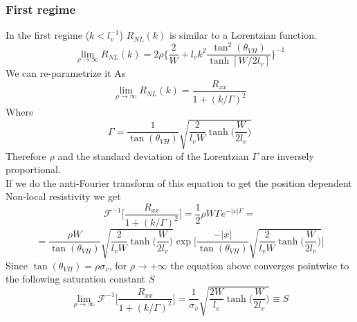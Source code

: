\subsubsection*{First regime}
In the first regime ($k< l_v^{-1}$) $R_{NL}(k)$ is similar to a Lorentzian function.
\begin{equation}
    \lim_{\rho\to\infty} R_{NL}(k)=2\rho
    \bigg\{
        \frac 2W+ l_vk^2\frac{\tan^2(\theta_{VH})}{\tanh[W/2l_v]}  
    \bigg\}^{-1}
\end{equation}
We can re-parametrize it As
\begin{equation}
    \lim_{\rho\to\infty} R_{NL}(k)=\frac{R_{xx}}{1+(k/\Gamma)^2}
\end{equation}
Where 
\[
    \Gamma=\frac 1 {\tan(\theta_{VH})}\sqrt{\frac 2{l_vW} \tanh\bigg(\frac W{2l_v}\bigg)}
\]
Therefore $\rho$ and the standard deviation of the Lorentzian $\Gamma$ are inversely proportional.\\
If we do the anti-Fourier transform of this equation to get the position dependent Non-local resistivity we get 
\[
    \mathcal F^{-1}\bigg[\frac{R_{xx}}{1+(k/\Gamma)^2} \bigg]=\frac 12\rho W\Gamma {e^{-|x|\Gamma}}=
\]
\begin{equation}
    =\frac {\rho W}{\tan(\theta_{VH})}\sqrt{\frac 2{l_v W}\tanh\bigg(\frac W{2l_v}\bigg)}
    \exp\Bigg[
        \frac{-|x|}{\tan(\theta_{VH})}\sqrt{\frac 2{l_v W}\tanh\bigg(\frac W{2l_v}\bigg)}
    \Bigg]
\end{equation}
Since $\tan(\theta_{VH})=\rho \sigma_v$, for $\rho\to +\infty$ the equation above converges pointwise to the following saturation constant $S$
\begin{equation}
    \lim_{\rho\to\infty}\mathcal F^{-1}\bigg[\frac{R_{xx}}{1+(k/\Gamma)^2} \bigg]=\frac 1{\sigma_v}\sqrt{\frac {2W}{l_v}\tanh\bigg(\frac W{2l_v} \bigg)}\equiv S
\end{equation}

